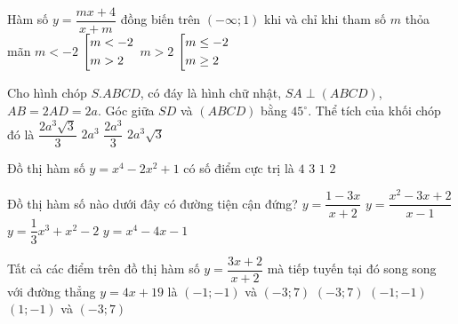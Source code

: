 \begin{ex}%
{
}
\end{ex}

\begin{ex}%
Hàm số $y=\dfrac{mx+4}{x+m}$ đồng biến trên $(-\infty;1)$ khi và chỉ khi tham số $m$ thỏa mãn
\choice
{\True $m<-2$}
{$\left[\begin{aligned}&m<-2\\&m>2\end{aligned}\right.$}
{$m>2$}
{$\left[\begin{aligned}&m\leq -2\\&m\geq 2\end{aligned}\right.$}
\end{ex}

\begin{ex}%
Cho hình chóp $S.ABCD$, có đáy là hình chữ nhật, $SA\perp (ABCD)$, $AB=2AD=2a$. Góc giữa $SD$ và $(ABCD)$ bằng $45^{\circ}$. Thể tích của khối chóp đó là
\choice
{$\dfrac{2a^3\sqrt{3}}{3}$}
{$2a^3$}
{\True $\dfrac{2a^3}{3}$}
{$2a^3\sqrt{3}$}
\end{ex}

\begin{ex}%
Đồ thị hàm số $y=x^4-2x^2+1$ có số điểm cực trị là
\choice
{$4$}
{\True $3$}
{$1$}
{$2$}
\end{ex}

\begin{ex}%
Đồ thị hàm số nào dưới đây có đường tiện cận đứng?
\choice
{\True $y=\dfrac{1-3x}{x+2}$}
{$y=\dfrac{x^2-3x+2}{x-1}$}
{$y=\dfrac{1}{3}x^3+x^2-2$}
{$y=x^4-4x-1$}
\end{ex}

\begin{ex}%
Tất cả các điểm trên đồ thị hàm số $y=\dfrac{3x+2}{x+2}$ mà tiếp tuyến tại đó song song với đường thẳng $y=4x+19$ là
\choice
{\True $(-1;-1)$ và $(-3;7)$}
{$(-3;7)$}
{$(-1;-1)$}
{$(1;-1)$ và $(-3;7)$}
\end{ex}



